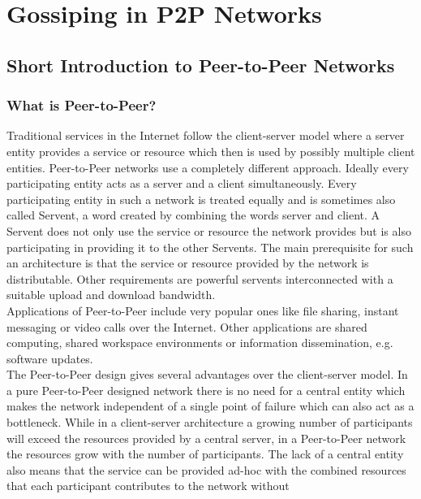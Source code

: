 \chapter{Gossiping in P2P Networks} 
\label{chap:gossiping}


\section{Short Introduction to Peer-to-Peer Networks}
\subsection{What is Peer-to-Peer?}
Traditional services in the Internet follow the client-server model where a
server entity provides a service or resource which then is used by
possibly multiple client entities. Peer-to-Peer networks use a completely
different approach. Ideally every participating entity acts as a server and a
client simultaneously. Every participating entity in such a network is treated
equally and is sometimes also called Servent, a word created by combining the
words server and client. A Servent does not only use the service or resource
the network provides but is also participating in providing it to the other
Servents. The main prerequisite for such an architecture is that the service or
resource provided by the network is distributable. Other requirements are
powerful servents interconnected with a suitable upload and download bandwidth.
\\%
Applications of Peer-to-Peer include very popular ones like file
sharing, instant messaging or video calls over the Internet. Other applications
are shared computing, shared workspace environments or information
dissemination, e.g. software updates.
\\%
The Peer-to-Peer design gives several advantages over the client-server model.
In a pure Peer-to-Peer designed network there is no need for a central entity
which makes the network independent of a single point of failure which can also
act as a bottleneck. While in a client-server architecture a growing number of
participants will exceed the resources provided by a central server, in a
Peer-to-Peer network the resources grow with the number of participants. The
lack of a central entity also means that the service can be provided ad-hoc with
the combined resources that each participant contributes to the network without

